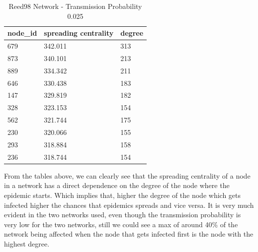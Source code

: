 \documentclass{article}
\begin{document}
\begin{table}[H]
\centering
\caption{Reed98 Network - Transmission Probability 0.025}
\label{Reed98}
\begin{tabular}{|l|l|l|}
\hline
node\_id & spreading centrality & degree \\
\hline
679      & 342.011              & 313    \\
873      & 340.101              & 213    \\
889      & 334.342              & 211    \\
646      & 330.438              & 183    \\
147      & 329.819              & 182    \\
328      & 323.153              & 154    \\
562      & 321.744              & 175    \\
230      & 320.066              & 155    \\
293      & 318.884              & 158    \\
236		 & 318.744			   & 154    \\
\hline
\end{tabular}
\end{table} 

From the tables above, we can clearly see that the spreading centrality of a node in a network has a direct dependence on the degree of the node where the epidemic starts. Which implies that, higher the degree of the node which gets infected higher the chances that epidemics spreads and vice versa. It is very much evident in the two networks used, even though the transmission probability is very low for the two networks, still we could see a max of around 40\% of the network being affected when the node that gets infected first is the node with the highest degree.
\newpage
\end{document}
